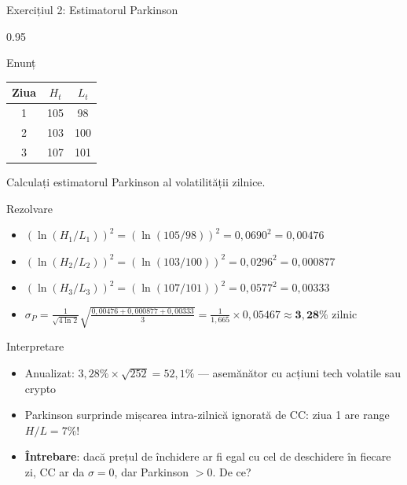 \documentclass[9pt, aspectratio=169, t]{beamer}
\begin{document}
\begin{frame}[shrink=35]{Exercițiul 2: Estimatorul Parkinson}
    \begin{cminipage}{0.95\textwidth}
    \begin{block}{Enunț}
    \begin{center}
    {\small\renewcommand{\arraystretch}{1.3}
    \begin{tabular}{c c c}
    \toprule
    Ziua & $H_t$ & $L_t$ \\
    \midrule
    1 & 105 & 98 \\
    2 & 103 & 100 \\
    3 & 107 & 101 \\
    \bottomrule
    \end{tabular}}
    \end{center}
    Calculați estimatorul Parkinson al volatilității zilnice.
    \end{block}
    \vspace{0.1cm}
    \begin{exampleblock}{Rezolvare}
    \begin{itemize}\setlength{\itemsep}{0pt}
        \item $(\ln(H_1/L_1))^2 = (\ln(105/98))^2 = 0{,}0690^2 = 0{,}00476$
        \item $(\ln(H_2/L_2))^2 = (\ln(103/100))^2 = 0{,}0296^2 = 0{,}000877$
        \item $(\ln(H_3/L_3))^2 = (\ln(107/101))^2 = 0{,}0577^2 = 0{,}00333$
        \item $\sigma_P = \frac{1}{\sqrt{4\ln 2}}\sqrt{\frac{0{,}00476 + 0{,}000877 + 0{,}00333}{3}} = \frac{1}{1{,}665} \times 0{,}05467 \approx \mathbf{3{,}28\%}$ zilnic
    \end{itemize}
    \end{exampleblock}
    \begin{alertblock}{Interpretare}
    \begin{itemize}\setlength{\itemsep}{0pt}
        \item Anualizat: $3{,}28\% \times \sqrt{252} = 52{,}1\%$ --- asemănător cu acțiuni tech volatile sau crypto
        \item Parkinson surprinde mișcarea intra-zilnică ignorată de CC: ziua 1 are range $H/L = 7\%$!
        \item \textbf{Întrebare}: dacă prețul de închidere ar fi egal cu cel de deschidere în fiecare zi, CC ar da $\sigma = 0$, dar Parkinson $> 0$. De ce?
    \end{itemize}
    \end{alertblock}
    \end{cminipage}
\end{frame}
\end{document}
